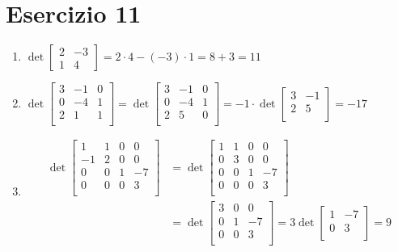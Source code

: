 \documentclass{article}
\newcommand*{\m}[1]{\begin{bmatrix}#1\end{bmatrix}}
\begin{document}
\section*{Esercizio 11}
\begin{enumerate}
    \item $
        \det\m{2 & -3 \\ 1 & 4} =
        2 \cdot 4 - (-3) \cdot 1 = 8 + 3 = 11
    $
    \item $
        \det\m{
            3 & -1 & 0 \\
            0 & -4 & 1 \\
            2 & 1 & 1 \\
        } = \det\m{
            3 & -1 & 0 \\
            0 & -4 & 1 \\
            2 & 5 & 0 \\
        } = -1 \cdot \det\m{
            3 & -1 \\
            2 &  5 \\
        } = -17
    $
    \item \[\begin{aligned}
        \det\m{
            1 & 1 & 0 & 0 \\
            -1 & 2 & 0 & 0 \\
            0 & 0 & 1 & -7 \\
            0 & 0 & 0 & 3 \\
        } &= \det\m{
            1 & 1 & 0 & 0 \\
            0 & 3 & 0 & 0 \\
            0 & 0 & 1 & -7 \\
            0 & 0 & 0 & 3 \\
        } \\ &= \det\m{
            3 & 0 & 0 \\
            0 & 1 & -7 \\
            0 & 0 & 3 \\
        } = 3 \det\m{
            1 & -7 \\
            0 & 3 \\
        } = 9
    \end{aligned}\]
\end{enumerate}
\end{document}
